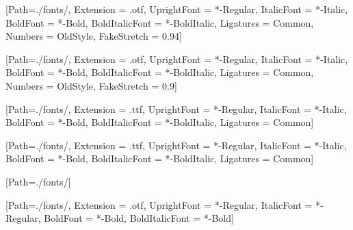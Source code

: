 
[Path=./fonts/,
  Extension      = .otf,
  UprightFont    = *-Regular,
  ItalicFont     = *-Italic,
  BoldFont       = *-Bold,
  BoldItalicFont = *-BoldItalic,
  Ligatures       = Common,
  Numbers         = OldStyle,
  FakeStretch     = 0.94]

[Path=./fonts/,
  Extension      = .otf,
  UprightFont    = *-Regular,
  ItalicFont     = *-Italic,
  BoldFont       = *-Bold,
  BoldItalicFont = *-BoldItalic,
  Ligatures       = Common,
  Numbers         = OldStyle,
  FakeStretch     = 0.9]



[Path=./fonts/,
  Extension      = .ttf,
  UprightFont    = *-Regular,
  ItalicFont     = *-Italic,
  BoldFont       = *-Bold,
  BoldItalicFont = *-BoldItalic,
  Ligatures      = Common]


[Path=./fonts/,
  Extension      = .ttf,
  UprightFont    = *-Regular,
  ItalicFont     = *-Italic,
  BoldFont       = *-Bold,
  BoldItalicFont = *-BoldItalic,
  Ligatures      = Common]

[Path=./fonts/]

[Path=./fonts/,
  Extension      = .otf,
  UprightFont    = *-Regular,
  ItalicFont     = *-Regular,
  BoldFont       = *-Bold,
  BoldItalicFont = *-Bold]

